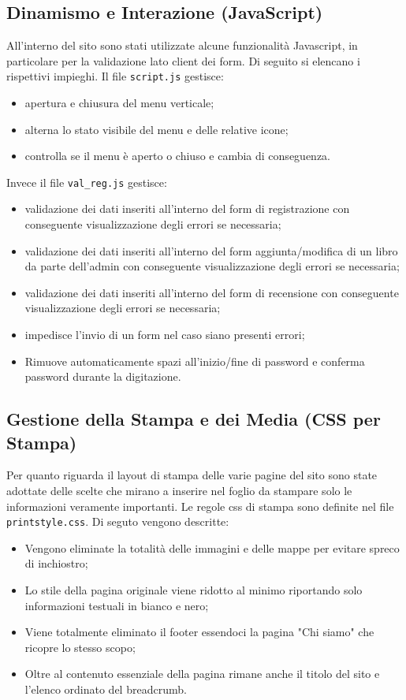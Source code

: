 \documentclass{article}
\begin{document}
\subsection{Dinamismo e Interazione (JavaScript)}
All'interno del sito sono stati utilizzate alcune funzionalità Javascript, in particolare per la validazione lato client dei form. Di seguito si elencano i rispettivi impieghi.
Il file \texttt{script.js} gestisce:
\begin{itemize}
    \item apertura e chiusura del menu verticale;
    \item alterna lo stato visibile del menu e delle relative icone;
    \item controlla se il menu è aperto o chiuso e cambia di conseguenza.
\end{itemize}

Invece il file \texttt{val\_reg.js} gestisce:

\begin{itemize}
    \item validazione dei dati inseriti all'interno del form di registrazione con conseguente visualizzazione degli errori se necessaria;
    \item validazione dei dati inseriti all'interno del form aggiunta/modifica di un libro da parte dell'admin con conseguente visualizzazione degli errori se necessaria;
    \item validazione dei dati inseriti all'interno del form di recensione con conseguente visualizzazione degli errori se necessaria;
    \item impedisce l'invio di un form nel caso siano presenti errori;
    \item Rimuove automaticamente spazi all'inizio/fine di password e conferma password durante la digitazione.
\end{itemize}



\subsection{Gestione della Stampa e dei Media (CSS per Stampa)}
Per quanto riguarda il layout di stampa delle varie pagine del sito sono state adottate delle scelte che mirano a inserire nel foglio da stampare solo le informazioni veramente importanti. Le regole css di stampa sono definite nel file \texttt{printstyle.css}. Di seguto vengono descritte:
\begin{itemize}
    \item Vengono eliminate la totalità delle immagini e delle mappe per evitare spreco di inchiostro;
    \item Lo stile della pagina originale viene ridotto al minimo riportando solo informazioni testuali in bianco e nero;
    \item Viene totalmente eliminato il footer essendoci la pagina "Chi siamo" che ricopre lo stesso scopo;
    \item Oltre al contenuto essenziale della pagina rimane anche il titolo del sito e l'elenco ordinato del breadcrumb.
\end{itemize}
\end{document}
